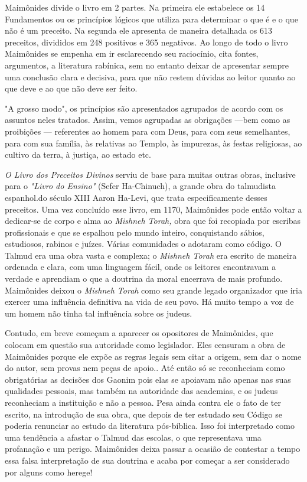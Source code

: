\begin{itemize}
\begin{enumrate}
Maimônides divide o livro em 2 partes. Na primeira ele estabelece os 14
Fundamentos ou os princípios lógicos que utiliza para determinar o que é
e o que não é um preceito. Na segunda ele apresenta de maneira detalhada
os 613 preceitos, divididos em 248 positivos e 365 negativos. Ao longo
de to­do o livro Maimônides se empenha em ir esclarecendo seu
raciocínio, cita fon­tes, argumentos, a literatura rabínica, sem no
entanto deixar de apresentar sem­pre uma conclusão clara e decisiva,
para que não restem dúvidas ao leitor quanto ao que deve e ao que não
deve ser feito.

"A grosso modo", os princípios são apresentados agrupados de acor­do com
os assuntos neles tratados. Assim, vemos agrupadas as obrigações ---bem
como as proibições --- referentes ao homem para com Deus, para com seus
semelhantes, para com sua família, às relativas ao Templo, às impurezas,
às festas religiosas, ao cultivo da terra, à justiça, ao estado etc.

\emph{O Livro dos Preceitos Divinos} serviu de base para muitas outras
obras, inclusive para o \emph{"Livro do Ensino"} (Sefer Ha-Chinuch), a
grande obra do tal­mudista espanhol.do século XIII Aaron Ha-Levi, que
trata especificamente des­ses preceitos.
Uma vez concluído esse livro, em 1170, Maimônides pode então vol­tar a
dedicar-se de corpo e alma ao \emph{Mishneh Torah,} obra que foi
recopiada por escribas profissionais e que se espalhou pelo mundo
inteiro, conquistando sá­bios, estudiosos, rabinos e juízes. Várias
comunidades o adotaram como códi­go. O Talmud era uma obra vasta e
complexa; o \emph{Mishneh Torah} era escrito de maneira ordenada e
clara, com uma linguagem fácil, onde os leitores encontra­vam a verdade
e aprendiam o que a doutrina da moral encerrava de mais pro­fundo.
Maimônides deixou o \emph{Mishneh Torah} como seu grande legado
organi­zador que iria exercer uma influência definitiva na vida de seu
povo. Há muito tempo a voz de um homem não tinha tal influência sobre os
judeus.

Contudo, em breve começam a aparecer os opositores de Maimôni­des, que
colocam em questão sua autoridade como legislador. Eles censuram a obra
de Maimônides porque ele expõe as regras legais sem citar a origem, sem
dar o nome do autor, sem provas nem peças de apoio.. Até então só se
reconhe­ciam como obrigatórias as decisões dos Gaonim pois elas se
apoiavam não ape­nas nas suas qualidades pessoais, mas também na
autoridade das academias, e os judeus reconheciam a instituição e não a
pessoa. Pesa ainda contra ele o fato de ter escrito, na introdução de
sua obra, que depois de ter estudado seu Códi­go se poderia renunciar ao
estudo da literatura pós-bíblica. Isso foi interpreta­do como uma
tendência a afastar o Talmud das escolas, o que representava uma
profanação e um perigo. Maimônides deixa passar a ocasião de contestar a
tem­po essa falsa interpretação de sua doutrina e acaba por começar a
ser conside­rado por alguns como herege!


\end{enumrate}
\end{itemize}
